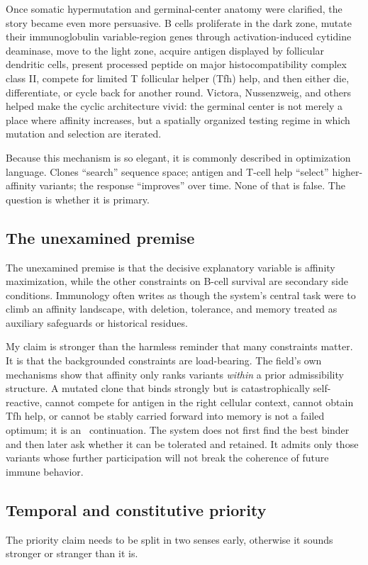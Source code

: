 \documentclass[11pt]{article}
\begin{document}
Once somatic hypermutation and germinal-center anatomy were clarified, the story became even more persuasive. B cells proliferate in the dark zone, mutate their immunoglobulin variable-region genes through activation-induced cytidine deaminase, move to the light zone, acquire antigen displayed by follicular dendritic cells, present processed peptide on major histocompatibility complex class II, compete for limited T follicular helper (Tfh) help, and then either die, differentiate, or cycle back for another round. Victora, Nussenzweig, and others helped make the cyclic architecture vivid: the germinal center is not merely a place where affinity increases, but a spatially organized testing regime in which mutation and selection are iterated.

Because this mechanism is so elegant, it is commonly described in optimization language. Clones ``search'' sequence space; antigen and T-cell help ``select'' higher-affinity variants; the response ``improves'' over time. None of that is false. The question is whether it is primary.

\subsection{The unexamined premise}
The unexamined premise is that the decisive explanatory variable is affinity maximization, while the other constraints on B-cell survival are secondary side conditions. Immunology often writes as though the system's central task were to climb an affinity landscape, with deletion, tolerance, and memory treated as auxiliary safeguards or historical residues.

My claim is stronger than the harmless reminder that many constraints matter. It is that the backgrounded constraints are load-bearing. The field's own mechanisms show that affinity only ranks variants \emph{within} a prior admissibility structure. A mutated clone that binds strongly but is catastrophically self-reactive, cannot compete for antigen in the right cellular context, cannot obtain Tfh help, or cannot be stably carried forward into memory is not a failed optimum; it is an \inadmissible\ continuation. The system does not first find the best binder and then later ask whether it can be tolerated and retained. It admits only those variants whose further participation will not break the coherence of future immune behavior.

\subsection{Temporal and constitutive priority}
The priority claim needs to be split in two senses early, otherwise it sounds stronger or stranger than it is.
\end{document}
